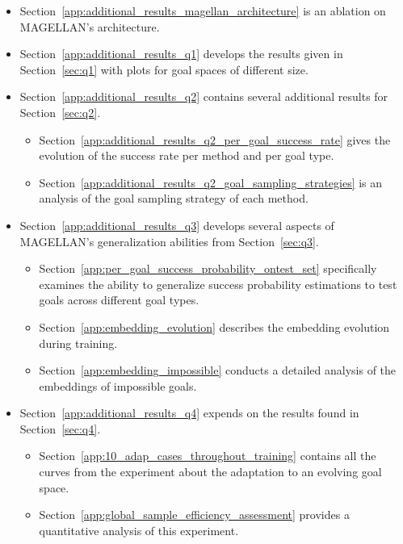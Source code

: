 \begin{itemize}
    \begin{itemize}
        \item Section~\ref{app:additional_results_magellan_architecture} is an ablation on MAGELLAN's architecture.
        \item Section~\ref{app:additional_results_q1} develops the results given in Section~\ref{sec:q1} with plots for goal spaces of different size.
        \item Section~\ref{app:additional_results_q2} contains several additional results for Section~\ref{sec:q2}.
        \begin{itemize}
            \item Section~\ref{app:additional_results_q2_per_goal_success_rate} gives the evolution of the success rate per method and per goal type.
            \item Section~\ref{app:additional_results_q2_goal_sampling_strategies} is an analysis of the goal sampling strategy of each method. 
        \end{itemize}
        \item Section~\ref{app:additional_results_q3} develops several aspects of MAGELLAN's generalization abilities from Section~\ref{sec:q3}.
        \begin{itemize}
            \item Section~\ref{app:per_goal_success_probability_ontest_set} specifically examines the ability to generalize success probability estimations to test goals across different goal types.
            \item Section~\ref{app:embedding_evolution} describes the embedding evolution during training.
            \item Section~\ref{app:embedding_impossible} conducts a detailed analysis of the embeddings of impossible goals.
        \end{itemize}
        \item Section~\ref{app:additional_results_q4} expends on the results found in Section~\ref{sec:q4}.
        \begin{itemize}
            \item Section~\ref{app:10_adap_cases_throughout_training} contains all the curves from the experiment about the adaptation to an evolving goal space. 
            \item Section~\ref{app:global_sample_efficiency_assessment} provides a quantitative analysis of this experiment.
        \end{itemize}
    \end{itemize}
\end{itemize}

